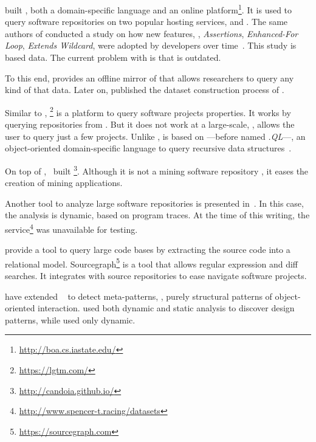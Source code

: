 \cite{dyerBoaLanguageInfrastructure2013,dyerDeclarativeVisitorsEase2013} built \boa{}, both a domain-specific language and an online platform\footnote{\url{http://boa.cs.iastate.edu/}}. 
It is used to query software repositories on two popular hosting services, \github{} and \sourceforge{}.
The same authors of \boa{} conducted a study on
how new \java{} features, \eg,
\emph{Assertions},
\emph{Enhanced-For Loop},
\emph{Extends Wildcard},
were adopted by developers over time~\citep{dyerMiningBillionsAST2014}.
This study is based \sourceforge{} data.
The current problem with \sourceforge{} is that is outdated.

To this end, \cite{gousiosGHTorentDatasetTool2013} provides an offline mirror of \github{} that allows researchers to query any kind of that data.
Later on, \cite{gousiosLeanGHTorrentGitHub2014} published the dataset construction process of \github{}.

Similar to \boa{}, \lgtm{}\footnote{\url{https://lgtm.com/}} is a platform to query software projects properties.
It works by querying repositories from \github{}.
But it does not work at a large-scale, \ie{}, \lgtm{} allows the user to query just a few projects.
Unlike \boa{}, \lgtm{} is based on \ql{}---before named \emph{.QL}---,
an object-oriented domain-specific language to query recursive data structures~\cite{avgustinovQLObjectorientedQueries2016}.

On top of \boa{},~\cite{tiwariCandoiaPlatformBuilding2017} built \candoia{}%
\footnote{\url{http://candoia.github.io/}}.
Although it is not a mining software repository \perse{},
it eases the creation of mining applications. 

Another tool to analyze large software repositories is presented in~\cite{brandauerSpencerInteractiveHeap2017}.
In this case, the analysis is dynamic, based on program traces. 
At the time of this writing, the service\footnote{\url{http://www.spencer-t.racing/datasets}} was unavailable for testing. 

\cite{bajracharyaSourcererInternetscaleSoftware2009} provide a tool to query large code bases by extracting the source code into a relational model.
Sourcegraph\footnote{\url{https://sourcegraph.com}} is a tool that allows regular expression and diff searches.
It integrates with source repositories to ease navigate software projects.

\cite{posnettTHEXMiningMetapatterns2010} have extended
\asm{}~\citep{brunetonASMCodeManipulation2002,kuleshovUsingASMFramework2007}
to detect meta-patterns, \ie,
purely structural patterns of object-oriented interaction.
\cite{huDynamicAnalysisDesign2008} used both dynamic and static analysis to discover design patterns, while \cite{arcelliDesignPatternDetection2008} used only dynamic.

